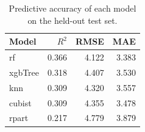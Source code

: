 \begin{table}[htbp]
\centering
\caption{Predictive accuracy of each model on the held-out test set.}
\label{tab:accuracy}
\begin{tabular}{lrrr}
\hline
\textbf{Model} & \textbf{$R^2$} & \textbf{RMSE} & \textbf{MAE} \\
\hline
rf & 0.366 & 4.122 & 3.383 \\
xgbTree & 0.318 & 4.407 & 3.530 \\
knn & 0.309 & 4.320 & 3.557 \\
cubist & 0.309 & 4.355 & 3.478 \\
rpart & 0.217 & 4.779 & 3.879 \\
\hline
\end{tabular}
\end{table}
